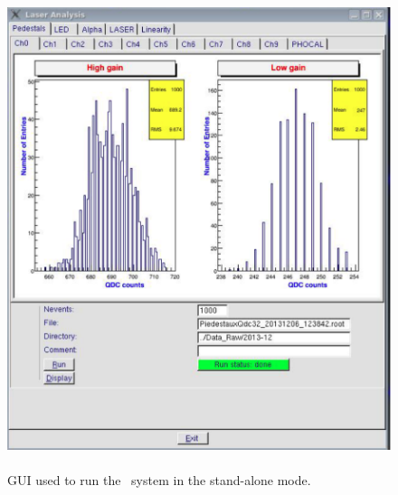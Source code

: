 \begin{appendices}

\section{}\label{app}

\begin{figure}[htbp]
\centering
\includegraphics[height=14cm]{figures/Stand_alone_GUI}
\caption{GUI used to run the \lasii~system in the stand-alone mode.}\label{fig:lasstandgui}
\end{figure}

\newpage



\end{appendices}
